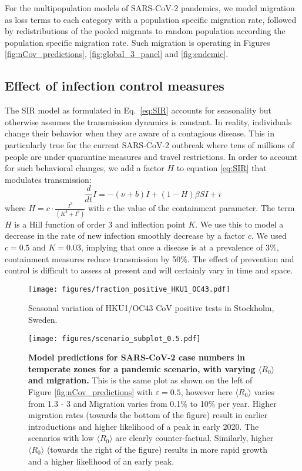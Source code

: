 \documentclass[rmp, reprint, superscriptaddress, floatfix,amsmath]{revtex4-1}
\newcommand{\forcing}{\varepsilon}
\begin{document}
For the multipopulation models of SARS-CoV-2 pandemics, we model migration as loss terms to each category with a population specific migration rate, followed by redistributions of the pooled migrants to random population according the population specific migration rate. 
Such migration is operating in Figures \ref{fig:nCov_predictions}, \ref{fig:global_3_panel} and \ref{fig:endemic}. 

\subsection*{Effect of infection control measures}
The SIR model as formulated in Eq.~\ref{eq:SIR} accounts for seasonality but otherwise assumes the transmission dynamics is constant. 
In reality, individuals change their behavior when they are aware of a contagious disease.
This in particularly true for the current SARS-CoV-2 outbreak where tens of millions of people are under quarantine measures and travel restrictions.
In order to account for such behavioral changes, we add a factor $H$ to equation \ref{eq:SIR} that modulates transmission:
\begin{equation}
\frac{d}{dt} I =  -(\nu+b) I + (1-H)\beta S I + i
\end{equation}
where $H = c\cdot\frac{I^3}{(K^3+I^3)}$ with $c$ the value of the containment parameter. 
The term $H$ is a Hill function of order 3 and inflection point $K$. 
We use this to model a decrease in the rate of new infection smoothly decrease by a factor $c$. 
We used $c=0.5$ and $K=0.03$, implying that once a disease is at a prevalence of 3\%, containment measures reduce transmission by 50\%.
The effect of prevention and control is difficult to assess at present and will certainly vary in time and space. 


\begin{figure}
    \centering
    \texttt{[image: figures/fraction\_positive\_HKU1\_OC43.pdf]}
    \caption{Seasonal variation of HKU1/OC43 CoV positive tests in Stockholm, Sweden. }
    \label{fig:seasonal_variation_supp}
\end{figure}

\begin{figure*}[h]
	\centering
	\texttt{[image: figures/scenario\_subplot\_0.5.pdf]}
	\caption{{\bf Model predictions for SARS-CoV-2 case numbers in temperate zones for a pandemic scenario, with varying $\langle R_0\rangle$ and migration.} This is the same plot as shown on the left of Figure \ref{fig:nCov_predictions} with $\forcing=0.5$, however here $\langle R_0\rangle$ varies from 1.3 - 3 and Migration varies from 0.1\% to 10\% per year. Higher migration rates (towards the bottom of the figure) result in earlier introductions and higher likelihood of a peak in early 2020.
	The scenarios with low $\langle R_0\rangle$ are clearly counter-factual. 
	Similarly, higher $\langle R_0\rangle$ (towards the right of the figure) results in more rapid growth and a higher likelihood of an early peak.}
	\label{fig:scenarios_supp}
\end{figure*}
\end{document}
